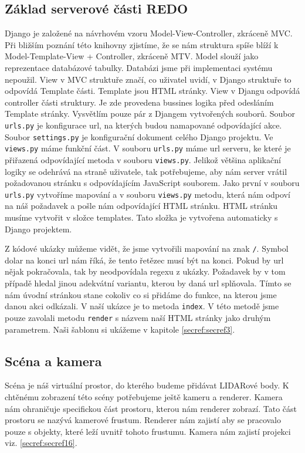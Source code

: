 \documentclass[czech,bachelor,dept420,male,cpdeclaration]{diploma}
\begin{document}
\subsection{Základ serverové části REDO}

Django je založené na návrhovém vzoru Model-View-Controller, zkráceně MVC. Při bližším poznání této knihovny zjistíme, že se nám struktura spíše blíží k Model-Template-View + Controller, zkráceně MTV. Model slouží jako reprezentace databázové tabulky. Databázi jsme při implementaci systému nepoužil. View v MVC struktuře značí, co uživatel uvidí, v Django struktuře to odpovídá Template části. Template jsou HTML stránky. View v Djangu odpovídá controller části struktury. Je zde provedena bussines logika před odesláním Template stránky. Vysvětlím pouze pár z Djangem vytvořených souborů. Soubor \texttt{urls.py} je konfigurace url, na kterých budou namapované odpovídající akce. Soubor \texttt{settings.py} je konfigurační dokument celého Django projektu. Ve \texttt{views.py} máme funkční část. V souboru \texttt{urls.py} máme url serveru, ke které je přiřazená odpovídající metoda v souboru \texttt{views.py}. Jelikož většina aplikační logiky se odehrává na straně uživatele, tak potřebujeme, aby nám server vrátil požadovanou stránku s odpovídajícím JavaScript souborem. Jako první v souboru \texttt{urls.py} vytvoříme mapování a v souboru \texttt{views.py} metodu, která nám odpoví na náš požadavek a pošle nám odpovídající HTML stránku. HTML stránku musíme vytvořit v složce templates. Tato složka je vytvořena automaticky s Django projektem. 



Z kódové ukázky můžeme vidět, že jsme vytvořili mapování na znak \texttt{/}. Symbol dolar na konci url nám říká, že tento řetězec musí být na konci. Pokud by url nějak pokračovala, tak by neodpovídala regexu z ukázky. Požadavek by v tom případě hledal jinou adekvátní variantu, kterou by daná url splňovala. Tímto se nám úvodní stránkou stane cokoliv co si přidáme do funkce, na kterou jsme danou akci odkázali. V naší ukázce je to metoda \texttt{index}. V této metodě jsme pouze zavolali metodu \texttt{render} s názvem naší HTML stránky jako druhým parametrem. Naši šablonu si ukážeme v kapitole \ref{secref:secref3}. 


\subsection{Scéna a kamera}
Scéna je náš virtuální prostor, do kterého budeme přidávat LIDARové body. K chtěnému zobrazení této scény potřebujeme ještě kameru a renderer. Kamera nám ohraničuje specifickou část prostoru, kterou nám renderer zobrazí. Tato část prostoru se nazývá kamerové frustum. Renderer nám zajistí aby se pracovalo pouze s objekty, které leží uvnitř tohoto frustumu. Kamera nám zajistí projekci viz. \ref{secref:secref16}. 
\end{document}

